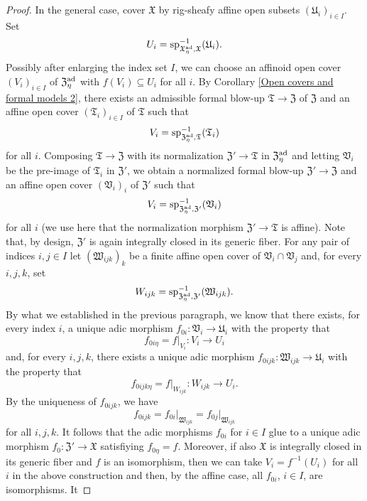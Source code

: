 \documentclass[12pt,twoside,a4paper]{article}
\theoremstyle{definition}
\theoremstyle{remark}
\newcommand\ad{{\rm ad}}
\newcommand\spc{{\rm sp}}
\begin{document}
\begin{proof}
In the general case, cover $\mathfrak{X}$ by rig-sheafy affine open subsets $(\mathfrak{U}_{i})_{i\in I}$. Set \begin{equation*}U_{i}=\spc_{\mathfrak{X}_{\eta}^{\ad},\mathfrak{X}}^{-1}(\mathfrak{U}_{i}).\end{equation*}Possibly after enlarging the index set $I$, we can choose an affinoid open cover $(V_{i})_{i\in I}$ of $\mathfrak{Z}_{\eta}^{\ad}$ with $f(V_{i})\subseteq U_{i}$ for all $i$. By Corollary \ref{Open covers and formal models 2}, there exists an admissible formal blow-up $\mathfrak{T}\to\mathfrak{Z}$ of $\mathfrak{Z}$ and an affine open cover $(\mathfrak{T}_{i})_{i\in I}$ of $\mathfrak{T}$ such that \begin{equation*}V_{i}=\spc_{\mathfrak{Z}_{\eta}^{\ad},\mathfrak{T}}^{-1}(\mathfrak{T}_{i})\end{equation*}for all $i$. Composing $\mathfrak{T}\to\mathfrak{Z}$ with its normalization $\mathfrak{Z}'\to\mathfrak{T}$ in $\mathfrak{Z}_{\eta}^{\ad}$ and letting $\mathfrak{V}_{i}$ be the pre-image of $\mathfrak{T}_{i}$ in $\mathfrak{Z}'$, we obtain a normalized formal blow-up $\mathfrak{Z}'\to\mathfrak{Z}$ and an affine open cover $(\mathfrak{V}_{i})_{i}$ of $\mathfrak{Z}'$ such that \begin{equation*}V_{i}=\spc_{\mathfrak{Z}_{\eta}^{\ad},\mathfrak{Z}'}^{-1}(\mathfrak{V}_{i})\end{equation*}for all $i$ (we use here that the normalization morphism $\mathfrak{Z}'\to\mathfrak{T}$ is affine). Note that, by design, $\mathfrak{Z}'$ is again integrally closed in its generic fiber. For any pair of indices $i, j\in I$ let $(\mathfrak{W}_{ijk})_{k}$ be a finite affine open cover of $\mathfrak{V}_{i}\cap\mathfrak{V}_{j}$ and, for every $i, j, k$, set \begin{equation*}W_{ijk}=\spc_{\mathfrak{Z}_{\eta}^{\ad},\mathfrak{Z}'}^{-1}(\mathfrak{W}_{ijk}).\end{equation*}By what we established in the previous paragraph, we know that there exists, for every index $i$, a unique adic morphism $f_{0i}: \mathfrak{V}_{i}\to\mathfrak{U}_{i}$ with the property that \begin{equation*}f_{0i\eta}=f\vert_{V_{i}}: V_{i}\to U_{i}\end{equation*}and, for every $i, j, k$, there exists a unique adic morphism $f_{0ijk}: \mathfrak{W}_{ijk}\to\mathfrak{U}_{i}$ with the property that \begin{equation*}f_{0ijk\eta}=f\vert_{W_{ijk}}: W_{ijk}\to U_{i}.\end{equation*}By the uniqueness of $f_{0ijk}$, we have \begin{equation*}f_{0ijk}=f_{0i}\vert_{\mathfrak{W}_{ijk}}=f_{0j}\vert_{\mathfrak{W}_{ijk}}\end{equation*}for all $i, j, k$. It follows that the adic morphisms $f_{0i}$ for $i\in I$ glue to a unique adic morphism $f_{0}: \mathfrak{Z}'\to \mathfrak{X}$ satisfiying $f_{0\eta}=f$. Moreover, if also $\mathfrak{X}$ is integrally closed in its generic fiber and $f$ is an isomorphism, then we can take $V_{i}=f^{-1}(U_{i})$ for all $i$ in the above construction and then, by the affine case, all $f_{0i}$, $i\in I$, are isomorphisms. It 
\end{proof}
\end{document}
